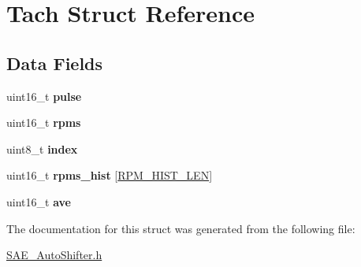 \hypertarget{struct_tach}{\section{Tach Struct Reference}
\label{struct_tach}
}
\subsection*{Data Fields}
\begin{DoxyCompactItemize}
\item 
\hypertarget{struct_tach_a1a8d74dba687155486d4c8b8e135596b}{uint16\-\_\-t {\bfseries pulse}}\label{struct_tach_a1a8d74dba687155486d4c8b8e135596b}

\item 
\hypertarget{struct_tach_a5d1fadcd5a3332f34e86e5f999e84e0c}{uint16\-\_\-t {\bfseries rpms}}\label{struct_tach_a5d1fadcd5a3332f34e86e5f999e84e0c}

\item 
\hypertarget{struct_tach_a319acaf9f8de490483e8ff5d5cb4d408}{uint8\-\_\-t {\bfseries index}}\label{struct_tach_a319acaf9f8de490483e8ff5d5cb4d408}

\item 
\hypertarget{struct_tach_a52bbe734dfee43e0550d14084a2a6f47}{uint16\-\_\-t {\bfseries rpms\-\_\-hist} \mbox{[}\hyperlink{defines_8h_aaf14a33c47932dfc82df5f2b09444c71}{R\-P\-M\-\_\-\-H\-I\-S\-T\-\_\-\-L\-E\-N}\mbox{]}}\label{struct_tach_a52bbe734dfee43e0550d14084a2a6f47}

\item 
\hypertarget{struct_tach_a8653bd5b693ebfe1a8dbde8bd5d9b48e}{uint16\-\_\-t {\bfseries ave}}\label{struct_tach_a8653bd5b693ebfe1a8dbde8bd5d9b48e}

\end{DoxyCompactItemize}


The documentation for this struct was generated from the following file\-:\begin{DoxyCompactItemize}
\item 
\hyperlink{_s_a_e___auto_shifter_8h}{S\-A\-E\-\_\-\-Auto\-Shifter.\-h}\end{DoxyCompactItemize}
